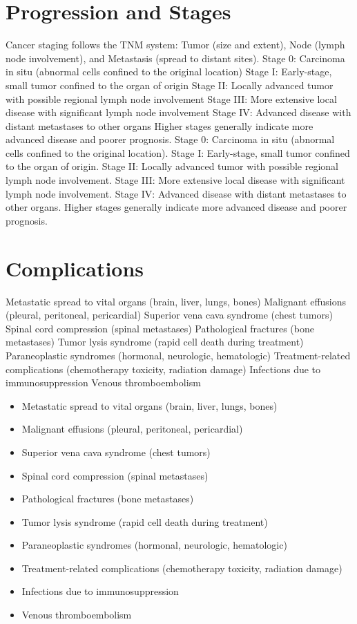 \section{Progression and Stages}
Cancer staging follows the TNM system: Tumor (size and extent), Node (lymph node involvement), and Metastasis (spread to distant sites). Stage 0: Carcinoma in situ (abnormal cells confined to the original location) Stage I: Early-stage, small tumor confined to the organ of origin Stage II: Locally advanced tumor with possible regional lymph node involvement Stage III: More extensive local disease with significant lymph node involvement Stage IV: Advanced disease with distant metastases to other organs Higher stages generally indicate more advanced disease and poorer prognosis. Stage 0: Carcinoma in situ (abnormal cells confined to the original location). Stage I: Early-stage, small tumor confined to the organ of origin. Stage II: Locally advanced tumor with possible regional lymph node involvement. Stage III: More extensive local disease with significant lymph node involvement. Stage IV: Advanced disease with distant metastases to other organs. Higher stages generally indicate more advanced disease and poorer prognosis.
\section{Complications}
Metastatic spread to vital organs (brain, liver, lungs, bones) Malignant effusions (pleural, peritoneal, pericardial) Superior vena cava syndrome (chest tumors) Spinal cord compression (spinal metastases) Pathological fractures (bone metastases) Tumor lysis syndrome (rapid cell death during treatment) Paraneoplastic syndromes (hormonal, neurologic, hematologic) Treatment-related complications (chemotherapy toxicity, radiation damage) Infections due to immunosuppression Venous thromboembolism

\begin{itemize}[noitemsep]
  \item Metastatic spread to vital organs (brain, liver, lungs, bones)
  \item Malignant effusions (pleural, peritoneal, pericardial)
  \item Superior vena cava syndrome (chest tumors)
  \item Spinal cord compression (spinal metastases)
  \item Pathological fractures (bone metastases)
  \item Tumor lysis syndrome (rapid cell death during treatment)
  \item Paraneoplastic syndromes (hormonal, neurologic, hematologic)
  \item Treatment-related complications (chemotherapy toxicity, radiation damage)
  \item Infections due to immunosuppression
  \item Venous thromboembolism
\end{itemize}
